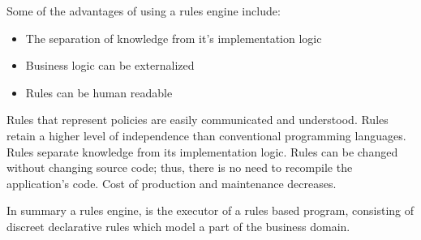 Some of the advantages of using a rules engine include:
\begin{itemize}
    \item The separation of knowledge from it's implementation logic
    \item Business logic can be externalized
    \item Rules can be human readable
\end{itemize}

Rules that represent policies are easily
communicated and understood.
Rules retain a higher level of independence than
conventional programming languages.
Rules separate knowledge from its implementation
logic.
Rules can be changed without changing source
code; thus, there is no need to recompile the
application's code.
Cost of production and maintenance decreases. 


In summary a rules engine, is the executor of a rules based program, consisting of discreet declarative rules which model a part of the business domain.







